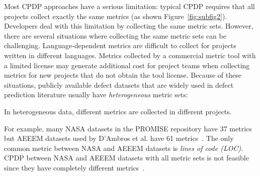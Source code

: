 Most CPDP approaches have a serious limitation:
typical CPDP requires that all projects collect exactly the same metrics (as shown Figure~\ref{fig:subfig2}).
Developers deal with this limitation by collecting the same metric sets.
However, there are several situations where collecting the same metric sets can be challenging. Language-dependent metrics are difficult to collect for projects written in different languages.
Metrics collected by a commercial metric tool with a limited license may generate additional cost for project teams when collecting metrics for new projects that do not obtain the tool license. Because of these situations,
publicly available defect
datasets that are widely used in defect prediction literature usually have
{\em heterogeneous} metric sets:
\squishlist
\item
In heterogeneous data, different metrics are collected in different projects.
\item
For example, many NASA datasets in the PROMISE repository have 37 metrics but
AEEEM datasets used by D'Ambros et al. have 61
metrics~\cite{DAmbros12,promise12}.
The only common metric between NASA and AEEEM datasets is {\em lines of
code (LOC)}.
CPDP between NASA and AEEEM
datasets with all metric sets is not feasible since they have
completely different metrics~\cite{Turhan09}.
\squishend


